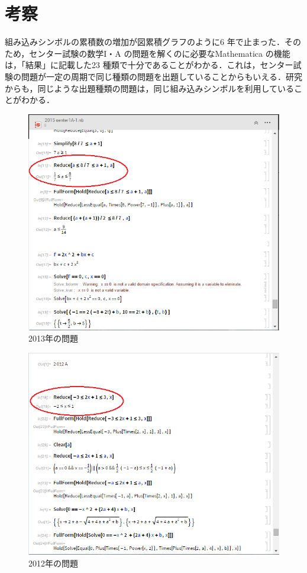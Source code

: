 \chapter{考察}

組み込みシンボルの累積数の増加が図累積グラフのように6 年で止まった．そのため，センター試験の数学I・A の問題を解くのに必要なMathematica の機能は，「結果」に記載した23 種類で十分であることがわかる．これは，センター試験の問題が一定の周期で同じ種類の問題を出題していることからもいえる．研究からも，同じような出題種類の問題は，同じ組み込みシンボルを利用していることがわかる．

\begin{figure}[h]
\centering
\includegraphics[width=15cm]{2013reidai.png}
\caption{2013年の問題}\label{図}
\end{figure}

\begin{figure}[h]
\centering
\includegraphics[width=15cm]{2012reidai.png}
\caption{2012年の問題}\label{図}
\end{figure}


